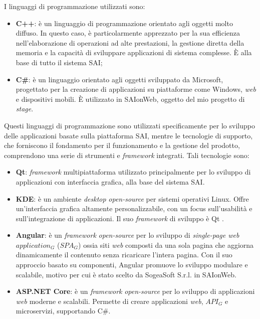     \vspace{0.2 em}
    \noindent I linguaggi di programmazione utilizzati sono:
    \begin{itemize}
        \item \textbf{C++}: è un linguaggio di programmazione orientato agli oggetti molto diffuso. In questo caso, è particolarmente apprezzato per la sua efficienza nell'elaborazione di operazioni ad alte prestazioni, la gestione diretta della memoria e la capacità di sviluppare applicazioni di sistema complesse. È alla base di tutto il sistema SAI;
        \item \textbf{C\#}: è un linguaggio orientato agli oggetti sviluppato da Microsoft, progettato per la creazione di applicazioni su piattaforme come Windows, \textit{web} e dispositivi mobili. È utilizzato in SAIonWeb, oggetto del mio progetto di \textit{stage}.
    \end{itemize}
    Questi linguaggi di programmazione sono utilizzati specificamente per lo sviluppo delle applicazioni basate sulla piattaforma SAI, mentre le tecnologie di supporto, che forniscono il fondamento per il funzionamento e la gestione del prodotto, comprendono una serie di strumenti e \textit{framework} integrati. Tali tecnologie sono:

    \begin{itemize}
        \item \textbf{Qt}: \textit{framework} multipiattaforma utilizzato principalmente per lo sviluppo di applicazioni con interfaccia grafica, alla base del sistema SAI.
        \item \textbf{KDE}: è un ambiente \textit{desktop} \textit{open-source} per sistemi operativi Linux. Offre un'interfaccia grafica altamente personalizzabile, con un focus sull'usabilità e sull'integrazione di applicazioni. Il suo \textit{framework} di sviluppo è Qt .
        \item \textbf{Angular}: è un \textit{framework} \textit{open-source} per lo sviluppo di \textit{single-page web $application_G$} ($SPA_G$) ossia siti \textit{web} composti da una sola pagina che aggiorna dinamicamente il contenuto senza ricaricare l'intera pagina. Con il suo approccio basato su componenti, Angular promuove lo sviluppo modulare e scalabile, motivo per cui è stato scelto da SogeaSoft S.r.l. in SAIonWeb. 
        \item \textbf{ASP.NET Core}: è un \textit{framework} \textit{open-source} per lo sviluppo di applicazioni \textit{web} moderne e scalabili. Permette di creare applicazioni \textit{web}, $API_G$ e microservizi, supportando C\#.
    \end{itemize}


